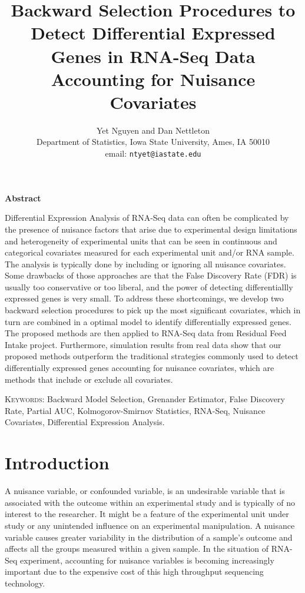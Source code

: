 \documentclass[12pt, letter]{article}\usepackage[]{graphicx}\usepackage[]{color}
\begin{document}
\title{ Backward Selection Procedures to  Detect Differential Expressed Genes in RNA-Seq Data
Accounting for Nuisance Covariates}
\author{Yet Nguyen and Dan Nettleton\\
Department of Statistics, 
Iowa State University, Ames, IA 50010\\ 
email: \texttt{ntyet@iastate.edu}
}

\maketitle



%
\begin{center}
\textbf{Abstract}
\end{center}
Differential Expression Analysis of RNA-Seq data can often be complicated by the presence of nuisance factors that arise due to experimental design limitations and heterogeneity of experimental units that can be seen in continuous and categorical covariates measured for each experimental unit and/or RNA sample. The analysis is typically done by including or ignoring all nuisance covariates. Some drawbacks of those approaches are that the False Discovery Rate (FDR) is usually too conservative or too liberal, and the power of detecting differentiallly expressed genes is very small. To address these shortcomings, we develop two backward selection procedures to pick up the most significant covariates, which in turn are combined in a optimal model  to identify differentially expressed genes. The proposed methods are then applied to RNA-Seq data from Residual Feed Intake project. Furthermore, simulation results from real data show that our proposed methods outperform the traditional strategies commonly used to detect differentially expressed genes accounting for nuisance covariates, which are methods that include or exclude all covariates.

\vspace*{.3in}

\noindent\textsc{Keywords}: {Backward Model Selection, Grenander Estimator,  False Discovery Rate, Partial AUC, Kolmogorov-Smirnov Statistics, RNA-Seq, Nuisance Covariates, Differential Expression Analysis.}

%

\section{ Introduction}
A nuisance variable, or confounded variable, is an undesirable variable that is associated with the outcome within an experimental study and is typically of no interest to the researcher. It might be a feature of the experimental unit under study or any unintended influence on an experimental manipulation. A nuisance variable causes greater variability in the distribution of a sample's outcome and affects all the groups measured within a given sample. In the situation of RNA-Seq experiment, accounting for nuisance variables is becoming increasingly important due to the expensive cost of this high throughput sequencing technology.
\end{document}
